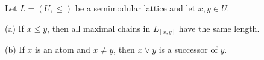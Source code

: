 Let $L = (U, \leq)$ be a semimodular lattice and let $x, y \in U$.

(a) If $x \leq y$, then all maximal chains in $L_{[x,y]}$ have the same length.

(b) If $x$ is an atom and $x \neq y$, then $x \vee y$ is a successor of $y$.
